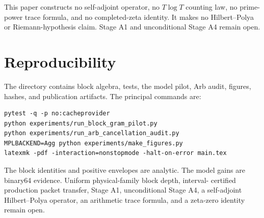 \documentclass[11pt]{article}
\begin{document}
This paper constructs no self-adjoint operator, no $T\log T$ counting law,
no prime-power trace formula, and no completed-zeta identity.  It makes no
Hilbert--Polya or Riemann-hypothesis claim.  Stage A1 and unconditional Stage
A4 remain open.

\section{Reproducibility}

The directory contains block algebra, tests, the model pilot, Arb audit,
figures, hashes, and publication artifacts.  The principal commands are:
\begin{verbatim}
pytest -q -p no:cacheprovider
python experiments/run_block_gram_pilot.py
python experiments/run_arb_cancellation_audit.py
MPLBACKEND=Agg python experiments/make_figures.py
latexmk -pdf -interaction=nonstopmode -halt-on-error main.tex
\end{verbatim}

The block identities and positive envelopes are analytic.  The model gains
are binary64 evidence.  Uniform physical-family block depth, interval-
certified production packet transfer, Stage A1, unconditional Stage A4, a
self-adjoint Hilbert--Polya operator, an arithmetic trace formula, and a
zeta-zero identity remain open.



\end{document}
